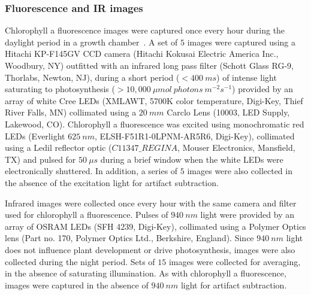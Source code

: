 \subsubsection{Fluorescence and IR images}
Chlorophyll a fluorescence images were captured once every hour during the daylight period in a growth chamber~\cite{cruz2015depi}. 
A set of $5$ images were captured using a Hitachi KP-F145GV CCD camera (Hitachi Kokusai Electric America Inc., Woodbury, NY) outfitted with an infrared long pass filter (Schott Glass RG-9, Thorlabs, Newton, NJ), during a short period ($<400~ms$) of intense light saturating to photosynthesis ($>10,000~\mu mol~photons~m^{-2} s^{-1}$) provided by an array of white Cree LEDs (XMLAWT, 5700K color temperature, Digi-Key, Thief River Falls, MN) collimated using a $20~mm$ Carclo Lens (10003, LED Supply, Lakewood, CO).
%
Chlorophyll a fluorescence was excited using monochromatic red LEDs (Everlight $625~nm$, ELSH-F51R1-0LPNM-AR5R6, Digi-Key), collimated using a Ledil reflector optic ($C11347\_REGINA$, Mouser Electronics, Mansfield, TX) and pulsed for $50~\mu s$ during a brief window when the white LEDs were electronically shuttered.  
In addition, a series of $5$ images were also collected in the absence of the excitation light for artifact subtraction.

Infrared images were collected once every hour with the same camera and filter used for chlorophyll a fluorescence.  
Pulses of $940~nm$ light were provided by an array of OSRAM LEDs (SFH 4239, Digi-Key), collimated using a Polymer Optics lens (Part no. 170, Polymer Optics Ltd., Berkshire, England).  
Since $940~nm$ light does not influence plant development or drive photosynthesis, images were also collected during the night period.  
Sets of $15$ images were collected for averaging, in the absence of saturating illumination.   
As with chlorophyll a fluorescence, images were captured in the absence of $940~nm$ light for artifact subtraction.

